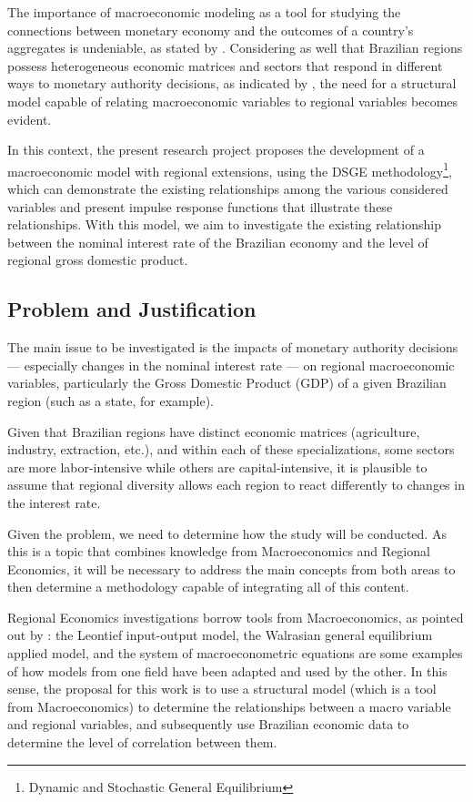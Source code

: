 \documentclass[
	thesis.tex
	]{subfiles}
\begin{document}
	The importance of macroeconomic modeling as a tool for studying the connections between monetary economy and the outcomes of a country's aggregates is undeniable, as stated by \textcite{gali_monetary_2015}. Considering as well that Brazilian regions possess heterogeneous economic matrices and sectors that respond in different ways to monetary authority decisions, as indicated by \textcite{bertanha_efeitos_2008}, the need for a structural model capable of relating macroeconomic variables to regional variables becomes evident.
	
	In this context, the present research project proposes the development of a macroeconomic model with regional extensions, using the DSGE methodology\footnote{Dynamic and Stochastic General Equilibrium}, which can demonstrate the existing relationships among the various considered variables and present impulse response functions that illustrate these relationships. With this model, we aim to investigate the existing relationship between the nominal interest rate of the Brazilian economy and the level of regional gross domestic product.
	
	\subsection*{Problem and Justification}
	
	The main issue to be investigated is the impacts of monetary authority decisions --- especially changes in the nominal interest rate --- on regional macroeconomic variables, particularly the Gross Domestic Product (GDP) of a given Brazilian region (such as a state, for example).
	
	Given that Brazilian regions have distinct economic matrices (agriculture, industry, extraction, etc.), and within each of these specializations, some sectors are more labor-intensive while others are capital-intensive, it is plausible to assume that regional diversity allows each region to react differently to changes in the interest rate.
	
	Given the problem, we need to determine how the study will be conducted. As this is a topic that combines knowledge from Macroeconomics and Regional Economics, it will be necessary to address the main concepts from both areas to then determine a methodology capable of integrating all of this content.
	
	Regional Economics investigations borrow tools from Macroeconomics, as pointed out by \textcite{rickman_modern_2010}: the Leontief input-output model, the Walrasian general equilibrium applied model, and the system of macroeconometric equations are some examples of how models from one field have been adapted and used by the other. In this sense, the proposal for this work is to use a structural model (which is a tool from Macroeconomics) to determine the relationships between a macro variable and regional variables, and subsequently use Brazilian economic data to determine the level of correlation between them.
	
\end{document}
